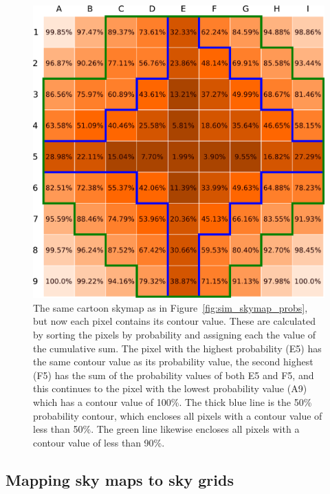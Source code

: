 \begin{colsection}
\begin{colsection}
\begin{figure}[p]
\begin{center}
\includegraphics[width=0.95\linewidth]{images/sim/sim_skymap_conts.pdf}

\end{center}

\caption[An example 2D skymap with pixel contour values]{The same cartoon skymap as in Figure~\ref{fig:sim_skymap_probs}, but now each pixel contains its contour value. These are calculated by sorting the pixels by probability and assigning each the value of the cumulative sum. The pixel with the highest probability (E5) has the same contour value as its probability value, the second highest (F5) has the sum of the probability values of both E5 and F5, and this continues to the pixel with the lowest probability value (A9) which has a contour value of 100\%. The thick blue line is the 50\% probability contour, which encloses all pixels with a contour value of less than 50\%. The green line likewise encloses all pixels with a contour value of less than 90\%.
}
\label{fig:sim_skymap_conts}
\end{figure}


\end{colsection}


\subsection{Mapping sky maps to sky grids}
\label{sec:mapping_skymaps}
\begin{colsection}


\end{colsection}
\end{colsection}
